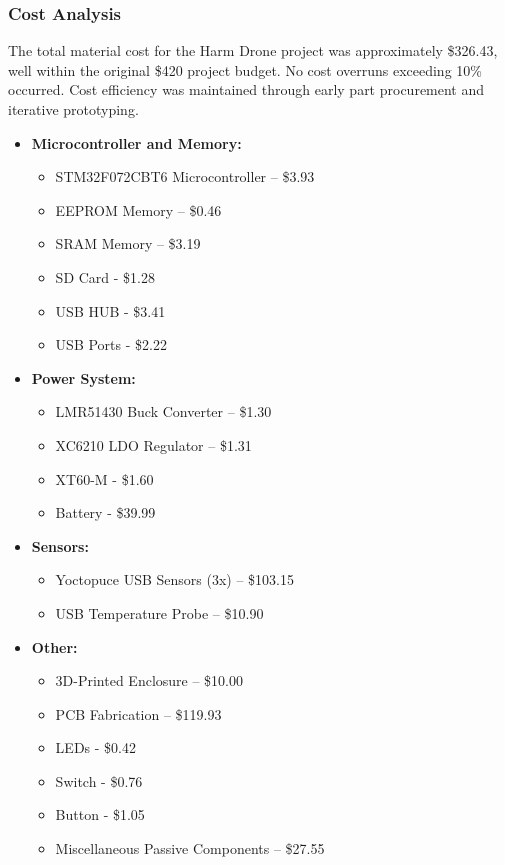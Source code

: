 \documentclass[12pt]{article}
\begin{document}
\subsubsection{Cost Analysis}

The total material cost for the Harm Drone project was approximately \$326.43, well within the original \$420 project budget. No cost overruns exceeding 10\% occurred. Cost efficiency was maintained through early part procurement and iterative prototyping.

\begin{itemize}
    \item \textbf{Microcontroller and Memory:}
    \begin{itemize}
        \item STM32F072CBT6 Microcontroller – \$3.93
        \item EEPROM Memory – \$0.46
        \item SRAM Memory – \$3.19
        \item SD Card - \$1.28
        \item USB HUB - \$3.41
        \item USB Ports - \$2.22
    \end{itemize}
    \item \textbf{Power System:}
    \begin{itemize}
        \item LMR51430 Buck Converter – \$1.30
        \item XC6210 LDO Regulator – \$1.31
        \item XT60-M - \$1.60
        \item Battery - \$39.99
    \end{itemize}
    \item \textbf{Sensors:}
    \begin{itemize}
        \item Yoctopuce USB Sensors (3x) – \$103.15
        \item USB Temperature Probe – \$10.90
    \end{itemize}
    \item \textbf{Other:}
    \begin{itemize}
        \item 3D-Printed Enclosure – \$10.00
        \item PCB Fabrication – \$119.93
        \item LEDs - \$0.42
        \item Switch - \$0.76
        \item Button - \$1.05
        \item Miscellaneous Passive Components – \$27.55
    \end{itemize}
\end{itemize}
\end{document}
